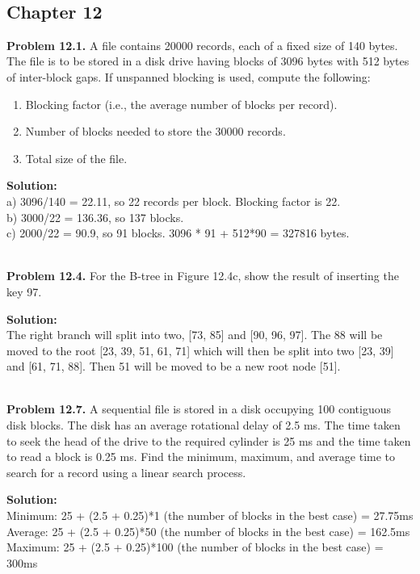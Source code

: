 \documentclass[12pt]{article}
\newcommand{\Problem}[1]{%
	\textbf{Problem #1.}%
}
\newcommand\Solution{%
	\noindent \textbf{Solution:}\\%
}
\begin{document}
~\\
\subsection*{Chapter 12}

\Problem{12.1} A file contains 20000 records, each of a fixed size of 140 bytes. The file is to be stored in a disk drive having blocks of 3096 bytes with 512 bytes of inter-block gaps. If unspanned blocking is used, compute the following:
	\begin{enumerate}[label=\textbf{\alph*}.]
		\item Blocking factor (i.e., the average number of blocks per record).
		\item Number of blocks needed to store the 30000 records.
		\item Total size of the file.
	\end{enumerate}
	
\Solution a) 3096/140 = 22.11, so 22 records per block. Blocking factor is 22.\\
	b) 3000/22 = 136.36, so 137 blocks. \\
	c) 2000/22 = 90.9, so 91 blocks. 3096 * 91 + 512*90 = 327816 bytes. 

~\\
\Problem{12.4} For the B-tree in Figure 12.4c, show the result of inserting the key 97.
	\begin{figure}[H]

	\end{figure}
	
\Solution The right branch will split into two, [73, 85] and [90, 96, 97]. The 88 will be moved to the root [23, 39, 51, 61, 71] which will then be split into two [23, 39] and [61, 71, 88]. Then 51 will be moved to be a new root node [51].

~\\
\Problem{12.7} A sequential file is stored in a disk occupying 100 contiguous disk blocks. The disk has an average rotational delay of 2.5 ms. The time taken to seek the head of the drive to the required cylinder is 25 ms and the time taken to read a block is 0.25 ms. Find the minimum, maximum, and average time to search for a record using a linear search process.

\Solution Minimum: 25 + (2.5 + 0.25)*1 (the number of blocks in the best case) = 27.75ms \\
Average: 25 + (2.5 + 0.25)*50 (the number of blocks in the best case) = 162.5ms\\
Maximum: 25 + (2.5 + 0.25)*100 (the number of blocks in the best case) = 300ms
\end{document}
